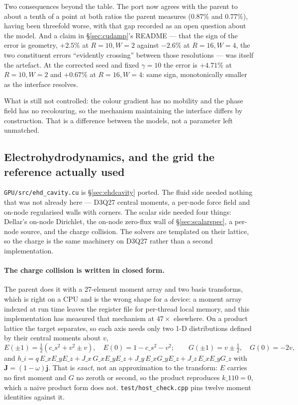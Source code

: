 \documentclass[11pt,a4paper]{article}
\newcommand{\code}[1]{\texttt{\small #1}}
\begin{document}
Two consequences beyond the table. The port now agrees with the parent to about
a tenth of a point at both ratios the parent measures ($0.87\%$ and $0.77\%$),
having been threefold worse, with that gap recorded as an open question about
the model. And a claim in \S\ref{sec:cudamp}'s README --- that the sign of the
error is geometry, $+2.5\%$ at $R = 10, W = 2$ against $-2.6\%$ at
$R = 16, W = 4$, the two constituent errors ``evidently crossing'' between those
resolutions --- was itself the artefact. At the corrected seed and fixed
$\gamma = 10$ the error is $+4.71\%$ at $R = 10, W = 2$ and $+0.67\%$ at
$R = 16, W = 4$: same sign, monotonically smaller as the interface resolves.

What is still not controlled: the colour gradient has no mobility and the phase
field has no recolouring, so the mechanism maintaining the interface differs by
construction. That is a difference between the models, not a parameter left
unmatched.

\subsection{Electrohydrodynamics, and the grid the reference actually used}
\label{sec:cudaehd}

\code{GPU/src/ehd\_cavity.cu} is \S\ref{sec:ehdcavity} ported. The fluid side needed
nothing that was not already here --- D3Q27 central moments, a per-node force field and
on-node regularised walls with corners. The scalar side needed four things:
Dellar's on-node Dirichlet, the on-node zero-flux wall of \S\ref{sec:scalarspec}, a
per-node source, and the charge collision. The solvers are templated on their lattice, so
the charge is the same machinery on D3Q27 rather than a second implementation.

\paragraph{The charge collision is written in closed form.} The parent does it with a
27-element moment array and two basis transforms, which is right on a CPU and is the wrong
shape for a device: a moment array indexed at run time leaves the register file for
per-thread local memory, and this implementation has measured that mechanism at $47\times$
elsewhere. On a product lattice the target separates, so each axis needs only two 1-D
distributions defined by their central moments about $v$,
\begin{equation}
  E(\pm1)=\tfrac12(c\_s^2+v^2\pm v),\quad E(0)=1-c\_s^2-v^2; \qquad
  G(\pm1)=v\pm\tfrac12,\quad G(0)=-2v,
\end{equation}
and $h\_i = q\,E\_xE\_yE\_z + J\_x\,G\_xE\_yE\_z + J\_y\,E\_xG\_yE\_z + J\_z\,E\_xE\_yG\_z$ with
$\bm J=(1-\omega)\bm j$. That is \emph{exact}, not an approximation to the transform: $E$
carries no first moment and $G$ no zeroth or second, so the product reproduces
$k\_{110}=0$, which a naive product form does not. \code{test/host\_check.cpp} pins twelve
moment identities against it.
\end{document}
